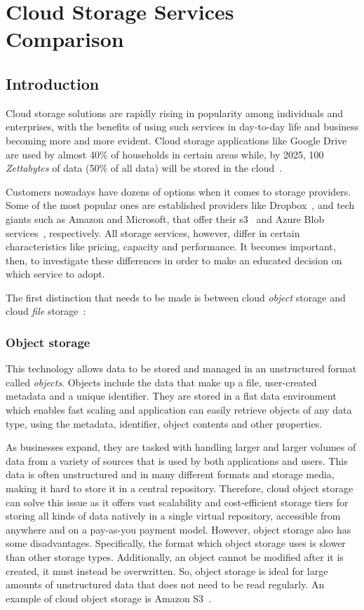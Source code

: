 \chapter{Cloud Storage Services Comparison}\label{ch:cloud-storage-services-comparison}

\section{Introduction}
Cloud storage solutions are rapidly rising in popularity among individuals and enterprises, with the benefits of using such services in day-to-day life and business becoming more and more evident. Cloud storage applications like Google Drive are used by almost 40\% of households in certain areas while, by 2025, 100 \textit{Zettabytes} of data (50\% of all data) will be stored in the cloud~\cite{zeta}.

Customers nowadays have dozens of options when it comes to storage providers. Some of the most popular ones are established providers like Dropbox~\cite{dropbox}, and tech giants such as Amazon and Microsoft, that offer their \ac{s3}~\cite{s3} and Azure Blob services~\cite{blob}, respectively. All storage services, however, differ in certain characteristics like pricing, capacity and performance. It becomes important, then, to investigate these differences in order to make an educated decision on which service to adopt.

The first distinction that needs to be made is between cloud \textit{object} storage and cloud \textit{file} storage~\cite{objectvsfile, objectvsfile2,ibm_cloud_storage}:

\subsection{Object storage}
This technology allows data to be stored and managed in an unstructured format called \textit{objects}. Objects include the data that make up a file, user-created metadata and a unique identifier. They are stored in a flat data environment which enables fast scaling and application can easily retrieve objects of any data type, using the metadata, identifier, object contents and other properties.

As businesses expand, they are tasked with handling larger and larger volumes of data from a variety of sources that is used by both applications and users. This data is often unstructured and in many different formats and storage media, making it hard to store it in a central repository. Therefore, cloud object storage can solve this issue as it offers vast scalability and cost-efficient storage tiers for storing all kinds of data natively in a single virtual repository, accessible from anywhere and on a pay-as-you payment model. However, object storage also has some disadvantages. Specifically, the format which object storage uses is slower than other storage types. Additionally, an object cannot be modified after it is created, it must instead be overwritten. So, object storage is  ideal for large amounts of unstructured data that does not need to be read regularly. An example of cloud object storage is Amazon S3~\cite{s3}.

